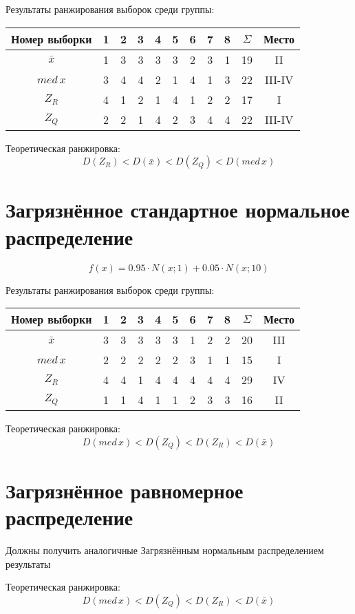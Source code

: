\documentclass{article} %
\begin{document}
Результаты ранжирования выборок среди группы:
\begin{center}
	\begin{tabular}{|c| c|c|c|c|c|c|c|c| c|c|} \hline
		Номер выборки & 1 & 2 & 3 & 4 & 5 & 6 & 7 & 8 & \(\Sigma\) & Место \\ \hline
		\(\bar{x}\)   & 1 & 3 & 3 & 3 & 3 & 2 & 3 & 1 & 19 & II \\ \hline
		\(med \, x\)      & 3 & 4 & 4 & 2 & 1 & 4 & 1 & 3 & 22 & III-IV \\ \hline
		\(Z_R\)       & 4 & 1 & 2 & 1 & 4 & 1 & 2 & 2 & 17 & I \\ \hline
		\(Z_Q\)       & 2 & 2 & 1 & 4 & 2 & 3 & 4 & 4 & 22 & III-IV \\ \hline
	\end{tabular}
\end{center}

Теоретическая ранжировка:
\[ D(Z_R) < D(\bar{x}) < D(Z_Q) < D(med \, x) \]

\section{Загрязнённое стандартное нормальное распределение}
\[ f(x) = 0.95 \cdot N(x;1) + 0.05 \cdot N(x;10)\]

Результаты ранжирования выборок среди группы:
\begin{center}
	\begin{tabular}{|c| c|c|c|c|c|c|c|c| c|c|} \hline
		Номер выборки & 1 & 2 & 3 & 4 & 5 & 6 & 7 & 8 & \(\Sigma\) & Место \\ \hline
		\(\bar{x}\)   & 3 & 3 & 3 & 3 & 3 & 1 & 2 & 2 & 20 & III \\ \hline
		\(med \, x\)      & 2 & 2 & 2 & 2 & 2 & 3 & 1 & 1 & 15 & I \\ \hline
		\(Z_R\)       & 4 & 4 & 1 & 4 & 4 & 4 & 4 & 4 & 29 & IV \\ \hline
		\(Z_Q\)       & 1 & 1 & 4 & 1 & 1 & 2 & 3 & 3 & 16 & II \\ \hline
	\end{tabular}
\end{center}

Теоретическая ранжировка:
\[ D(med \, x) < D(Z_Q) < D(Z_R) < D(\bar{x}) \]

\section{Загрязнённое равномерное распределение}
Должны получить аналогичные Загрязнённым нормальным распределением результаты

Теоретическая ранжировка:
\[ D(med \, x) < D(Z_Q) < D(Z_R) < D(\bar{x}) \]
\end{document}
